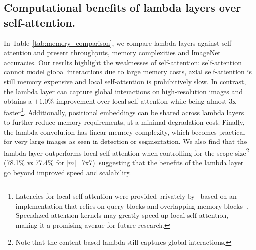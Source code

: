 \documentclass{article} \usepackage{iclr2021_conference,times}
\begin{document}
\subsection{Computational benefits of lambda layers over self-attention.}
In Table~\ref{tab:memory_comparison}, we compare lambda layers against self-attention and present throughputs, memory complexities and ImageNet accuracies.
Our results highlight the weaknesses of self-attention:
self-attention cannot model global interactions due to large memory costs, axial self-attention is still memory expensive and local self-attention is prohibitively slow.
In contrast, the lambda layer can capture global interactions on high-resolution images and obtains a $+1.0\%$ improvement over local self-attention while being almost 3x faster\footnote{
Latencies for local self-attention were provided privately by~\cite{ramachandran2019sasa} based on an implementation that relies on query blocks and overlapping memory blocks~\citep{parmar2018image}. 
Specialized attention kernels may greatly speed up local self-attention, making it a promising avenue for future research.
}.
Additionally, positional embeddings can be shared across lambda layers to further reduce memory requirements, at a minimal degradation cost.
Finally, the lambda convolution has linear memory complexity, which becomes practical for very large images as seen in detection or segmentation.
We also find that the lambda layer outperforms local self-attention when controlling for the scope size\footnote{Note that the content-based lambda still captures global interactions.} (78.1\% vs 77.4\% for $|m|$=7x7), suggesting that the benefits of the lambda layer go beyond improved speed and scalability.
\end{document}
